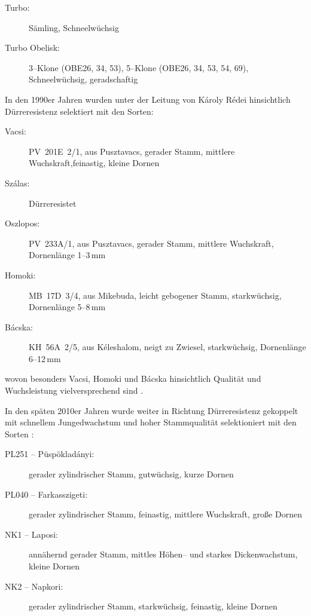 \documentclass[twocolumn]{scrartcl}
\begin{document}
\begin{description}
  \item[Turbo:] Sämling, Schneelwüchsig \citep{nemeth2022robinie}
  \item[Turbo Obelisk:] 3--Klone (OBE26, 34, 53), 5--Klone (OBE26, 34, 53, 54, 69), Schneelwüchsig, geradschaftig \citep{nemeth2022robinie}
\end{description}

In den 1990er Jahren wurden unter der Leitung von Károly Rédei
hinsichtlich Dürreresistenz selektiert mit den Sorten:
\begin{description}
  \item[Vacsi:] PV~201E~2/1, aus Pusztavacs, gerader Stamm, mittlere Wuchskraft,feinastig, kleine Dornen
  \item[Szálas:] Dürreresistet
  \item[Oszlopos:] PV~233A/1, aus Pusztavacs, gerader Stamm, mittlere Wuchskraft, Dornenlänge 1--3\,mm
  \item[Homoki:] MB~17D~3/4, aus Mikebuda, leicht gebogener Stamm, starkwüchsig, Dornenlänge 5--8\,mm
  \item[Bácska:] KH~56A~2/5, aus Kéleshalom, neigt zu Zwiesel, starkwüchsig, Dornenlänge 6--12\,mm
\end{description}
wovon besonders Vacsi, Homoki
und Bácska hinsichtlich Qualität und Wuchsleistung vielversprechend
sind \citep{keserue2021robinie,abri2023robinieUngarn,abri2024dis}.

In den späten 2010er Jahren wurde weiter in Richtung Dürreresistenz
gekoppelt mit schnellem Jungedwachstum und hoher Stammqualität
selektioniert mit den Sorten \citep{abri2023robinieUngarn,abri2024dis}:
\begin{description}
  \item[PL251 -- Püspökladányi:] gerader zylindrischer Stamm, gutwüchsig, kurze Dornen
  \item[PL040 -- Farkasszigeti:] gerader zylindrischer Stamm, feinastig, mittlere Wuchskraft, große Dornen
  \item[NK1 -- Laposi:] annähernd gerader Stamm, mittles Höhen-- und starkes Dickenwachstum, kleine Dornen
  \item[NK2 -- Napkori:] gerader zylindrischer Stamm, starkwüchsig,
feinastig, kleine Dornen
\end{description}
\end{document}
